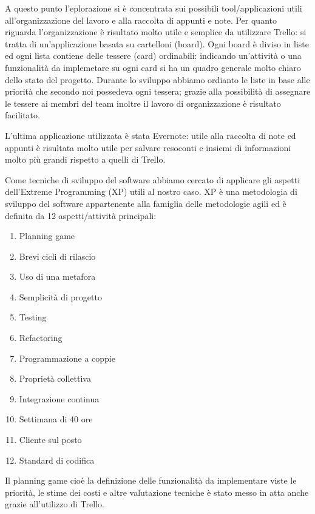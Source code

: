 \documentclass[12pt]{report}
\begin{document}
A questo punto l'eplorazione si è concentrata sui possibili tool/applicazioni utili all'organizzazione del lavoro e alla raccolta di appunti e note.
Per quanto riguarda l'organizzazione è risultato molto utile e semplice da utilizzare Trello: si tratta di un'applicazione basata su cartelloni (board). Ogni board è diviso in liste ed ogni lista contiene delle tessere (card) ordinabili: indicando un'attività o una funzionalità da implemetare su ogni card si ha un quadro generale molto chiaro dello stato del progetto. Durante lo sviluppo abbiamo ordianto le liste in base alle priorità che secondo noi possedeva ogni tessera; grazie alla possibilità di assegnare le tessere ai membri del team inoltre il lavoro di organizzazione è risultato facilitato.

L'ultima applicazione utilizzata è stata Evernote: utile alla raccolta di note ed appunti è risultata molto utile per salvare resoconti e insiemi di informazioni molto più grandi rispetto a quelli di Trello. 

Come tecniche di sviluppo del software abbiamo cercato di applicare gli aspetti dell'Extreme Programming (XP) utili al nostro caso. XP è una metodologia di sviluppo del software appartenente alla famiglia delle metodologie agili ed è definita da 12 aspetti/attività principali:
\begin{enumerate}
\item Planning game
\item Brevi cicli di rilascio
\item Uso di una metafora
\item Semplicità di progetto
\item Testing
\item Refactoring
\item Programmazione a coppie 
\item Proprietà collettiva 
\item Integrazione continua
\item Settimana di 40 ore
\item Cliente sul posto
\item Standard di codifica
\end{enumerate}

Il planning game cioè la definizione delle funzionalità da implementare viste le priorità, le stime dei costi e altre valutazione tecniche è stato messo in atta anche grazie all'utilizzo di Trello.
\end{document}

